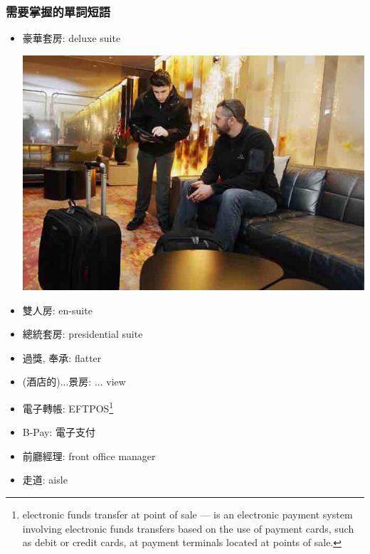 \subsubsection*{需要掌握的單詞短語}
\begin{multicols}{2}
\begin{itemize}
  \itemsep0em
  \item 豪華套房: deluxe suite
  \begin{center}
  	\includegraphics[scale=.36]{pics/check-in}
  \end{center}
  \item 雙人房: en-suite
  \item 總統套房: presidential suite
  \item 過獎, 奉承: flatter
  \item (酒店的)...景房: ... view
  \item 電子轉帳: EFTPOS\footnote{electronic funds transfer at point of sale — is an electronic payment system involving electronic funds transfers based on the use of payment cards, such as debit or credit cards, at payment terminals located at points of sale.}
  \item B-Pay: 電子支付
  \item 前廳經理: front office manager
  \item 走道: aisle
\end{itemize}
\end{multicols}

